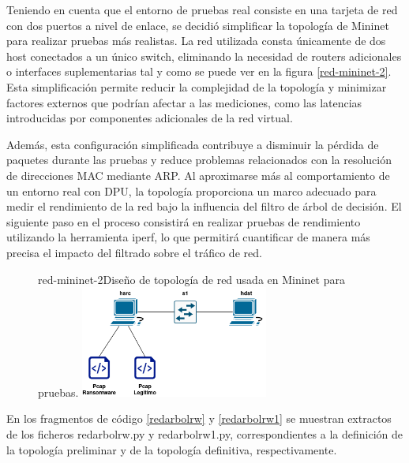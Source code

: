 Teniendo en cuenta que el entorno de pruebas real consiste en una tarjeta de red con dos puertos a nivel de enlace, se decidió simplificar la topología de Mininet para realizar pruebas más realistas. La red utilizada consta únicamente de dos host conectados a un único switch, eliminando la necesidad de routers adicionales o interfaces suplementarias tal y como se puede ver en la figura \ref{red-mininet-2}. Esta simplificación permite reducir la complejidad de la topología y minimizar factores externos que podrían afectar a las mediciones, como las latencias introducidas por componentes adicionales de la red virtual.

Además, esta configuración simplificada contribuye a disminuir la pérdida de paquetes durante las pruebas y reduce problemas relacionados con la resolución de direcciones MAC mediante ARP. Al aproximarse más al comportamiento de un entorno real con DPU, la topología proporciona un marco adecuado para medir el rendimiento de la red bajo la influencia del filtro de árbol de decisión. El siguiente paso en el proceso consistirá en realizar pruebas de rendimiento utilizando la herramienta iperf, lo que permitirá cuantificar de manera más precisa el impacto del filtrado sobre el tráfico de red.

\begin{figure}[Topología de Red Final]{red-mininet-2}{Diseño de topología de red usada en Mininet para pruebas.}
	\includegraphics[width=0.55\textwidth]{capturas/DiagramaRed2.png}
\end{figure}

En los fragmentos de código \ref{redarbolrw} y \ref{redarbolrw1} se muestran extractos de los ficheros redarbolrw.py y redarbolrw1.py, correspondientes a la definición de la topología preliminar y de la topología definitiva, respectivamente.



